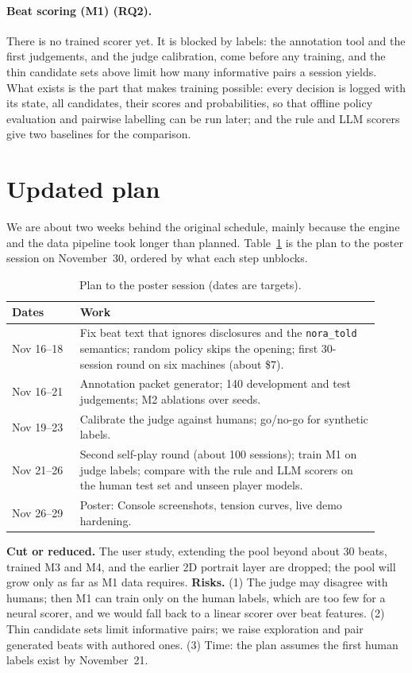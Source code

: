 \documentclass{article}
\begin{document}
\paragraph{Beat scoring (M1) (RQ2).}
There is no trained scorer yet. It is blocked by labels: the annotation tool and the first judgements, and the judge calibration, come before any training, and the thin candidate sets above limit how many informative pairs a session yields. What exists is the part that makes training possible: every decision is logged with its state, all candidates, their scores and probabilities, so that offline policy evaluation and pairwise labelling can be run later; and the rule and LLM scorers give two baselines for the comparison.

\section{Updated plan}
\label{sec:plan}

We are about two weeks behind the original schedule, mainly because the engine and the data pipeline took longer than planned. Table~\ref{tab:plan} is the plan to the poster session on November~30, ordered by what each step unblocks.

\begin{table}[t]
\centering\small
\caption{Plan to the poster session (dates are targets).}
\label{tab:plan}
\begin{tabular}{p{0.17\linewidth}p{0.75\linewidth}}
\toprule
Dates & Work \\
\midrule
Nov 16--18 & Fix beat text that ignores disclosures and the \texttt{nora\_told} semantics; random policy skips the opening; first 30-session round on six machines (about \$7). \\
Nov 16--21 & Annotation packet generator; 140 development and test judgements; M2 ablations over seeds. \\
Nov 19--23 & Calibrate the judge against humans; go/no-go for synthetic labels. \\
Nov 21--26 & Second self-play round (about 100 sessions); train M1 on judge labels; compare with the rule and LLM scorers on the human test set and unseen player models. \\
Nov 26--29 & Poster: Console screenshots, tension curves, live demo hardening. \\
\bottomrule
\end{tabular}
\end{table}

\textbf{Cut or reduced.} The user study, extending the pool beyond about 30 beats, trained M3 and M4, and the earlier 2D portrait layer are dropped; the pool will grow only as far as M1 data requires. \textbf{Risks.} (1) The judge may disagree with humans; then M1 can train only on the human labels, which are too few for a neural scorer, and we would fall back to a linear scorer over beat features. (2) Thin candidate sets limit informative pairs; we raise exploration and pair generated beats with authored ones. (3) Time: the plan assumes the first human labels exist by November~21.



\end{document}
